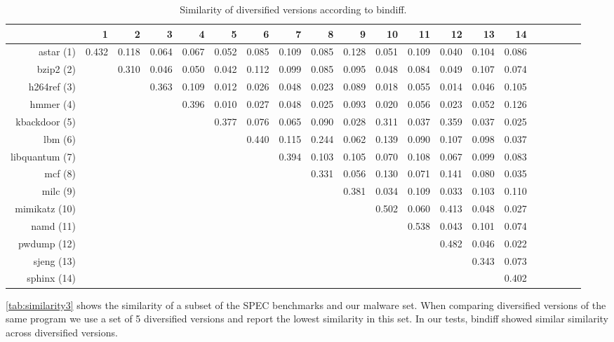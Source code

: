 \documentclass[letterpaper,twocolumn,10pt]{article}
\begin{document}
\begin{table}[ht!]
  \small
  \setlength{\tabcolsep}{2pt}
\begin{center}
\begin{tabular}{r|rrrrrrrrrrrrrrrrrrr}
		&	1	&	2	&	3	&	4	&	5	&	6	&	7	&	8	&	9	&	10	&	11	&	12	&	13	&	14	\\\hline
astar	(1)	&	0.432	&	0.118	&	0.064	&	0.067	&	0.052	&	0.085	&	0.109	&	0.085	&	0.128
&	0.051	&	0.109	&	0.040	&	0.104	&	0.086	\\
bzip2	(2)	&		&	0.310	&	0.046	&	0.050	&	0.042	&	0.112	&	0.099	&	0.085	&	0.095	&
0.048	&	0.084	&	0.049	&	0.107	&	0.074	\\
h264ref	(3)	&		&		&	0.363	&	0.109	&	0.012	&	0.026	&	0.048	&	0.023	&	0.089	&
0.018	&	0.055	&	0.014	&	0.046	&	0.105	\\
hmmer	(4)	&		&		&		&	0.396	&	0.010	&	0.027	&	0.048	&	0.025	&	0.093	&	0.020	&
0.056	&	0.023	&	0.052	&	0.126	\\
kbackdoor	(5)	&		&		&		&		&	0.377	&	0.076	&	0.065	&	0.090	&	0.028	&	0.311	&
0.037	&	0.359	&	0.037	&	0.025	\\
lbm	(6)	&		&		&		&		&		&	0.440	&	0.115	&	0.244	&	0.062	&	0.139	&	0.090	&
0.107	&	0.098	&	0.037	\\
libquantum (7)		&		&		&		&		&		&		&	0.394	&	0.103	&	0.105	&	0.070	&	0.108	&
0.067	&	0.099	&	0.083	\\
mcf	(8)	&		&		&		&		&		&		&		&	0.331	&	0.056	&	0.130	&	0.071	&	0.141	&
0.080	&	0.035	\\
milc	(9)	&		&		&		&		&		&		&		&		&	0.381	&	0.034	&	0.109	&	0.033	&	0.103
&	0.110	\\
mimikatz	(10)	&		&		&		&		&		&		&		&		&		&	0.502	&	0.060	&	0.413	&	0.048
&	0.027	\\
namd	(11)	&		&		&		&		&		&		&		&		&		&		&	0.538	&	0.043	&	0.101	&	0.074
\\
pwdump	(12)	&		&		&		&		&		&		&		&		&		&		&		&	0.482	&	0.046	&	0.022	\\
sjeng		(13) &		&		&		&		&		&		&		&		&		&		&		&		&	0.343	&	0.073	\\
sphinx		(14) &		&		&		&		&		&		&		&		&		&		&		&		&		&	0.402	\\
\end{tabular}
\caption{Similarity of diversified versions according to bindiff.}
\label{tab:similarity3}
\end{center}
\end{table}

\autoref{tab:similarity3} shows the similarity of a subset of the SPEC
benchmarks and our malware set. When comparing diversified versions of the same
program we use a set of 5 diversified versions and report the lowest similarity
in this set. In our tests, bindiff showed similar similarity across diversified
versions.
\end{document}
